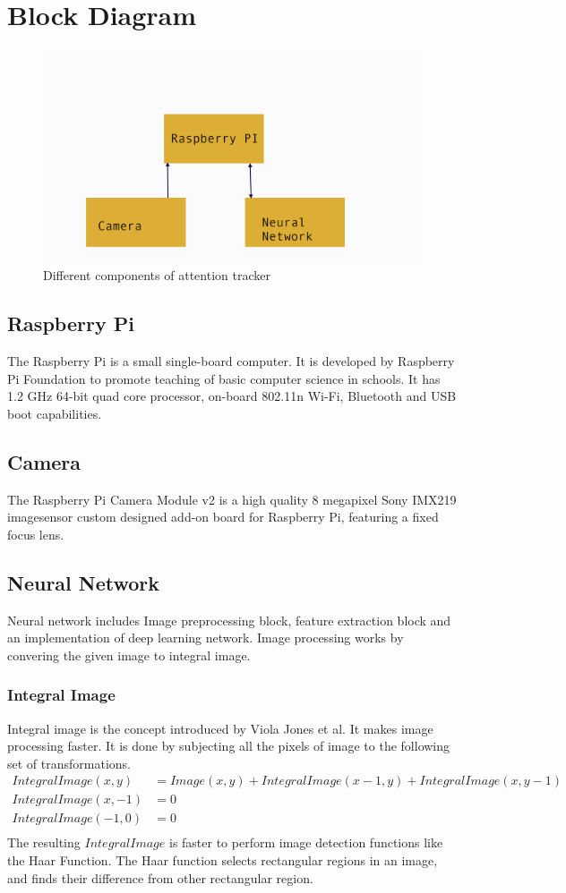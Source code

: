 \section{Block Diagram}
\begin{figure}[ht]
\centering
\includegraphics[scale=0.7]{block}
\caption{Different components of attention tracker}
\end{figure}

\subsection{Raspberry Pi}
The Raspberry Pi is a small single-board computer. It is developed by Raspberry Pi Foundation to promote teaching of basic computer science in schools. It has  1.2 GHz 64-bit quad core processor, on-board 802.11n Wi-Fi, Bluetooth and USB boot capabilities. 
\subsection{Camera}
The Raspberry Pi Camera Module v2 is a high quality 8 megapixel Sony IMX219 imagesensor custom designed add-on board for Raspberry Pi, featuring a fixed focus lens.
\subsection{Neural Network}
Neural network includes Image preprocessing block, feature extraction block and an implementation of deep learning network. Image processing works by convering the given image to integral image.
\subsubsection{Integral Image}
Integral image is the concept introduced by Viola Jones et al. It makes image processing faster. It is done by subjecting all the pixels of image to the following set of transformations.
\begin{align*}
    IntegralImage(x,y) &=Image(x,y)+IntegralImage(x-1,y)+IntegralImage(x,y-1)\\
    IntegralImage(x,-1) &=0\\
    IntegralImage(-1,0) &=0\\
\end{align*}
The resulting $IntegralImage$ is faster to perform image detection functions like the Haar Function. The Haar function selects rectangular regions in an image, and finds their difference from other
rectangular region.
